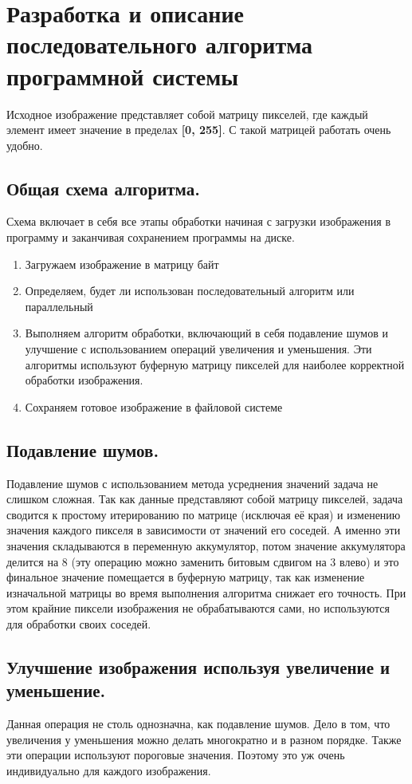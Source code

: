 \section{Разработка и описание последовательного алгоритма программной системы}\label{sec:devalgorythms}
Исходное изображение представляет собой матрицу пикселей, где каждый элемент имеет значение в пределах \textbf{[0, 255]}.
С такой матрицей работать очень удобно.

\subsection{Общая схема алгоритма.}\label{subsec:devalgorythms}
Схема включает в себя все этапы обработки начиная с загрузки изображения в программу и заканчивая сохранением программы на диске.
\begin{enumerate}
    \item Загружаем изображение в матрицу байт
    \item Определяем, будет ли использован последовательный алгоритм или параллельный
    \item Выполняем алгоритм обработки, включающий в себя подавление шумов и улучшение с использованием операций увеличения и уменьшения.
    Эти алгоритмы используют буферную матрицу пикселей для наиболее корректной обработки изображения.
    \item Сохраняем готовое изображение в файловой системе
\end{enumerate}

\subsection{Подавление шумов.}\label{subsec:denoise}
Подавление шумов с использованием метода усреднения значений задача не слишком сложная.
Так как данные представляют собой матрицу пикселей, задача сводится к простому итерированию по матрице (исключая её края) и изменению значения каждого пикселя в зависимости от значений его соседей.
А именно эти значения складываются в переменную аккумулятор, потом значение аккумулятора делится на 8 (эту операцию можно заменить битовым сдвигом на 3 влево) и это финальное значение помещается в буферную матрицу, так как изменение изначальной матрицы во время выполнения алгоритма снижает его точность.
При этом крайние пиксели изображения не обрабатываются сами, но используются для обработки своих соседей.

\subsection{Улучшение изображения используя увеличение и уменьшение.}\label{subsec:upgrade}
Данная операция не столь однозначна, как подавление шумов.
Дело в том, что увеличения у уменьшения можно делать многократно и в разном порядке.
Также эти операции используют пороговые значения.
Поэтому это уж очень индивидуально для каждого изображения.

